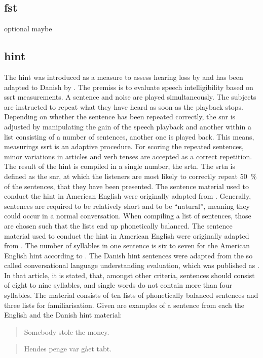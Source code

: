 \subsection{\gls{fst}}\label{ssec:fst}
optional maybe
\subsection{\gls{hint}}\label{ssec:hint}
The \gls{hint} was introduced as a measure to assess hearing loss by \citep{nilsson_95} and has been adapted to Danish by \citep{hint_2011}.
The premiss is to evaluate speech intelligibility based on \gls{ssrt} measurements. 
A sentence and noise are played simultaneously. The subjects are instructed to repeat what they have heard as soon as the playback stops. 
Depending on whether the sentence has been repeated correctly, the \gls{snr} is adjusted by manipulating the gain of the speech playback and another within a list consisting of a number of sentences, another one is played back. This means, measurings \gls{ssrt} is an adaptive procedure.
For scoring the repeated sentences, minor variations in articles and verb tenses are accepted as a correct repetition.
The result of the \gls{hint} is compiled in a single number, the \gls{srtn}.
The \gls{srtn} is defined as the \gls{snr}, at which the listeners are most likely to correctly repeat \SI{50}{\percent} of the sentences, that they have been presented.
The sentence material used to conduct the \gls{hint} in American English were originally adapted from \citep{bench_bamford_79}. 
Generally, sentences are required to be relatively short and to be \enquote{natural}, meaning they could occur in a normal conversation.
When compiling a list of sentences, those are chosen such that the lists end up phonetically balanced. 
The sentence material used to conduct the \gls{hint} in American English were originally adapted from \citep{bench_bamford_79}.
The number of syllables in one sentence is six to seven for the American English \gls{hint} according to \citep{nilsson_95}.
The Danish \gls{hint} sentences were adapted from the so called conversational language understanding evaluation, which was published as \citep{nielsen_dau_09}. In that article, it is stated, that, amongst other criteria, sentences should consist of eight to nine syllables, and single words do not contain more than four syllables.
The material consists of ten lists of phonetically balanced sentences and three lists for familiarisation.
Given are examples of a sentence from each the English and the Danish \gls{hint} material:
\begin{quote}
Somebody stole the money.
\end{quote}
\begin{quote}
Hendes penge var gået tabt.
\end{quote}

